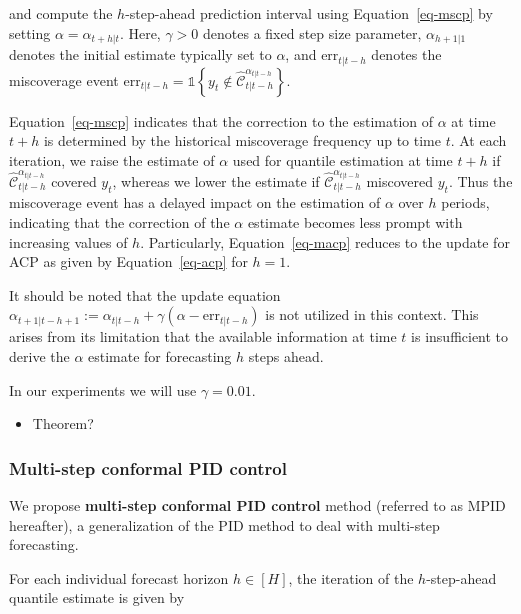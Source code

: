 \documentclass[
  11pt,
  a4paper,
]{article}
\providecommand{\tightlist}{%
  \setlength{\itemsep}{0pt}\setlength{\parskip}{0pt}}\usepackage{longtable,booktabs,array}
\theoremstyle{plain}
\theoremstyle{plain}
\theoremstyle{remark}
\begin{document}
and compute the \(h\)-step-ahead prediction interval using
Equation~\ref{eq-mscp} by setting \(\alpha = \alpha_{t+h|t}\). Here,
\(\gamma > 0\) denotes a fixed step size parameter, \(\alpha_{h+1|1}\)
denotes the initial estimate typically set to \(\alpha\), and
\(\mathrm{err}_{t|t-h}\) denotes the miscoverage event
\(\mathrm{err}_{t|t-h} = \mathbb{1}\left\{y_t \notin \hat{\mathcal{C}}_{t|t-h}^{\alpha_{t|t-h}}\right\}\).

Equation~\ref{eq-mscp} indicates that the correction to the estimation
of \(\alpha\) at time \(t+h\) is determined by the historical
miscoverage frequency up to time \(t\). At each iteration, we raise the
estimate of \(\alpha\) used for quantile estimation at time \(t+h\) if
\(\hat{\mathcal{C}}_{t|t-h}^{\alpha_{t|t-h}}\) covered \(y_t\), whereas
we lower the estimate if \(\hat{\mathcal{C}}_{t|t-h}^{\alpha_{t|t-h}}\)
miscovered \(y_t\). Thus the miscoverage event has a delayed impact on
the estimation of \(\alpha\) over \(h\) periods, indicating that the
correction of the \(\alpha\) estimate becomes less prompt with
increasing values of \(h\). Particularly, Equation~\ref{eq-macp} reduces
to the update for ACP as given by Equation~\ref{eq-acp} for \(h=1\).

It should be noted that the update equation
\(\alpha_{t+1|t-h+1} := \alpha_{t|t-h} + \gamma\left(\alpha - \mathrm{err}_{t|t-h}\right)\)
is not utilized in this context. This arises from its limitation that
the available information at time \(t\) is insufficient to derive the
\(\alpha\) estimate for forecasting \(h\) steps ahead.

In our experiments we will use \(\gamma=0.01\).

\begin{itemize}
\tightlist
\item
  Theorem?
\end{itemize}

\subsubsection{Multi-step conformal PID
control}\label{multi-step-conformal-pid-control}

We propose \textbf{multi-step conformal PID control} method (referred to
as MPID hereafter), a generalization of the PID method to deal with
multi-step forecasting.

For each individual forecast horizon \(h\in[H]\), the iteration of the
\(h\)-step-ahead quantile estimate is given by
\end{document}
